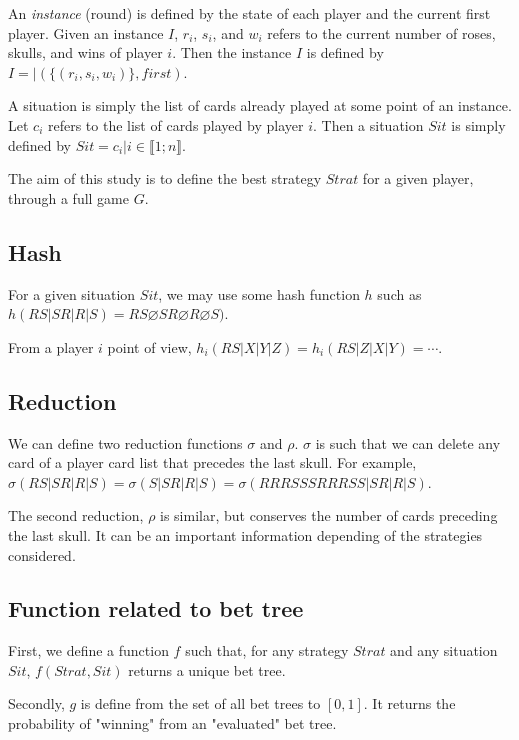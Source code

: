 \documentclass[]{article}       %
\begin{document}
An \emph{instance} (round) is defined by the state of each player and the current first player. Given an instance $I$, $r_i$, $s_i$, and $w_i$ refers to the current number of roses, skulls, and wins of player $i$. Then the instance $I$ is defined by $I=|\left(\lbrace (r_i,s_i,w_i)\rbrace, first\right)$.\newline

A situation is simply the list of cards already played at some point of an instance. Let $c_i$ refers to the list of cards played by player $i$. Then a situation $Sit$ is simply defined by $Sit={c_i|i\in\llbracket 1;n\rrbracket}$.\newline

The aim of this study is to define the best strategy $Strat$ for a given player, through a full game $G$.

\subsection{Hash}
For a given situation $Sit$, we may use some hash function $h$ such as $h(RS|SR|R|S)=RS\varnothing SR\varnothing R\varnothing S)$.

From a player $i$ point of view, $h_i(RS|X|Y|Z)=h_i(RS|Z|X|Y)=\cdots$.

\subsection{Reduction}
We can define two reduction functions $\sigma$ and $\rho$. $\sigma$ is such that we can delete any card of a player card list that precedes the last skull. For example, $\sigma(RS|SR|R|S)=\sigma(S|SR|R|S)=\sigma(RRRSSSRRRSS|SR|R|S)$.

The second reduction, $\rho$ is similar, but conserves the number of cards preceding the last skull. It can be an important information depending of the strategies considered.

\subsection{Function related to bet tree}
First, we define a function $f$ such that, for any strategy $Strat$ and any situation $Sit$, $f(Strat,Sit)$ returns a unique bet tree.

Secondly, $g$ is define from the set of all bet trees to $\left[ 0,1 \right] $. It returns the probability of "winning" from an "evaluated" bet tree.
\end{document}
